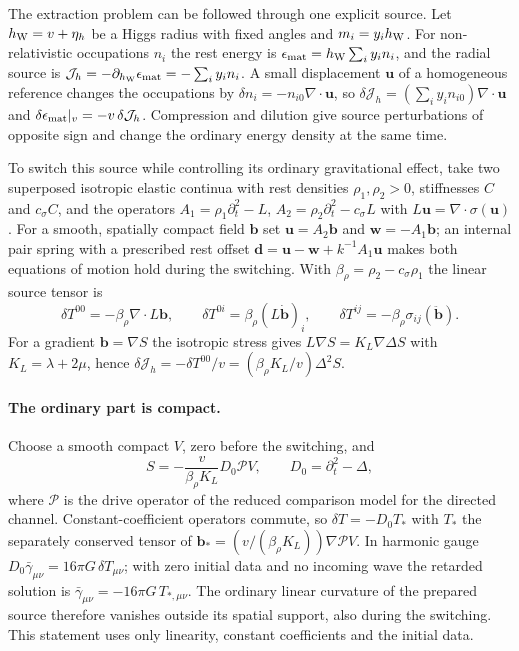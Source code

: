 The extraction problem can be followed through one explicit source.
Let $h_{\rm W}=v+\eta_h$ be a Higgs radius with fixed angles and
$m_i=y_ih_{\rm W}$. For non-relativistic occupations $n_i$ the rest
energy is $\epsilon_{\rm mat}=h_{\rm W}\sum_iy_in_i$, and the radial
source is $\mathcal J_h=-\partial_{h_{\rm W}}\epsilon_{\rm mat}
=-\sum_iy_in_i$. A small displacement $\mathbf u$ of a homogeneous
reference changes the occupations by $\delta n_i=-n_{i0}\nabla\cdot\mathbf u$,
so $\delta\mathcal J_h=(\sum_iy_in_{i0})\nabla\cdot\mathbf u$ and
$\delta\epsilon_{\rm mat}|_v=-v\,\delta\mathcal J_h$. Compression and
dilution give source perturbations of opposite sign and change the
ordinary energy density at the same time.

To switch this source while controlling its ordinary gravitational
effect, take two superposed isotropic elastic continua with rest
densities $\rho_1,\rho_2>0$, stiffnesses $C$ and $c_\sigma C$, and the
operators $A_1=\rho_1\partial_t^2-L$, $A_2=\rho_2\partial_t^2-c_\sigma L$
with $L\mathbf u=\nabla\cdot\sigma(\mathbf u)$. For a smooth, spatially
compact field $\mathbf b$ set $\mathbf u=A_2\mathbf b$ and
$\mathbf w=-A_1\mathbf b$; an internal pair spring with a prescribed
rest offset $\mathbf d=\mathbf u-\mathbf w+k^{-1}A_1\mathbf u$ makes both
equations of motion hold during the switching. With
$\beta_\rho=\rho_2-c_\sigma\rho_1$ the linear source tensor is
\[
 \delta T^{00}=-\beta_\rho\nabla\cdot L\mathbf b,\qquad
 \delta T^{0i}=\beta_\rho(L\dot{\mathbf b})_i,\qquad
 \delta T^{ij}=-\beta_\rho\sigma_{ij}(\ddot{\mathbf b}).
\]
For a gradient $\mathbf b=\nabla S$ the isotropic stress gives
$L\nabla S=K_L\nabla\Delta S$ with $K_L=\lambda+2\mu$, hence
$\delta\mathcal J_h=-\delta T^{00}/v=(\beta_\rho K_L/v)\Delta^2S$.

\paragraph{The ordinary part is compact.}
Choose a smooth compact $V$, zero before the switching, and
\[
 S=-\frac{v}{\beta_\rho K_L}D_0\mathcal P V,\qquad D_0=\partial_t^2-\Delta,
\]
where $\mathcal P$ is the drive operator of the reduced comparison model
for the directed channel. Constant-coefficient operators commute, so
$\delta T=-D_0T_*$ with $T_*$ the separately conserved tensor of
$\mathbf b_*=(v/(\beta_\rho K_L))\nabla\mathcal PV$. In harmonic gauge
$D_0\bar\gamma_{\mu\nu}=16\pi G\,\delta T_{\mu\nu}$; with zero initial
data and no incoming wave the retarded solution is
$\bar\gamma_{\mu\nu}=-16\pi G\,T_{*,\mu\nu}$. The ordinary linear
curvature of the prepared source therefore vanishes outside its
spatial support, also during the switching. This statement uses only
linearity, constant coefficients and the initial data.

